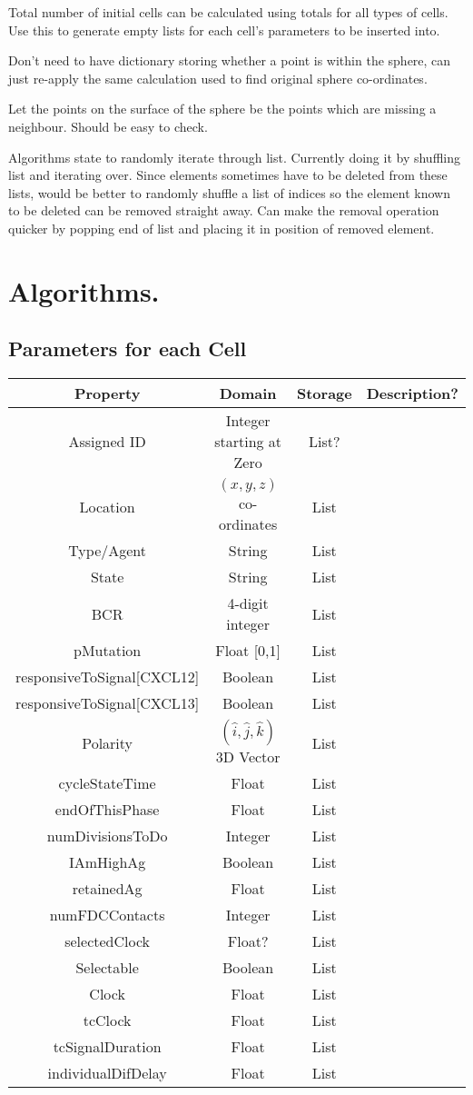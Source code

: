 \documentclass[english]{article}
\begin{document}
Total number of initial cells can be calculated using totals for all types of cells. Use this to generate empty lists for each cell's parameters to be inserted into. 

Don't need to have dictionary storing whether a point is within the sphere, can just re-apply the same calculation used to find original sphere co-ordinates. 

Let the points on the surface of the sphere be the points which are missing a neighbour. Should be easy to check.

Algorithms state to randomly iterate through list. Currently doing it by shuffling list and iterating over. Since elements sometimes have to be deleted from these lists, would be better to randomly shuffle a list of indices so the element known to be deleted can be removed straight away. Can make the removal operation quicker by popping end of list and placing it in position of removed element. 




\section{Algorithms.}

\subsection{Parameters for each Cell}
\begin{center}

\begin{tabular}{|c|c|c|c|}
\hline 
Property & Domain & Storage & Description?\tabularnewline
\hline 
\hline 
Assigned ID & Integer starting at Zero & List? & \tabularnewline
\hline 
Location & $(x,y,z)$ co-ordinates & List & \tabularnewline
\hline
Type/Agent & String & List & \tabularnewline
\hline 
State & String & List & \tabularnewline
\hline 
BCR & 4-digit integer & List & \tabularnewline
\hline 
pMutation & Float [0,1] & List & \tabularnewline
\hline 
responsiveToSignal{[}CXCL12{]} & Boolean & List & \tabularnewline
\hline 
responsiveToSignal{[}CXCL13{]} & Boolean & List & \tabularnewline
\hline 
Polarity & $(\hat{i},\hat{j},\hat{k})$ 3D Vector  & List & \tabularnewline
\hline 
cycleStateTime & Float & List & \tabularnewline
\hline 
endOfThisPhase & Float & List & \tabularnewline
\hline 
numDivisionsToDo & Integer & List & \tabularnewline
\hline 
IAmHighAg & Boolean & List & \tabularnewline
\hline 
retainedAg & Float & List & \tabularnewline
\hline 
numFDCContacts & Integer & List & \tabularnewline
\hline 
selectedClock & Float? & List & \tabularnewline
\hline 
Selectable & Boolean & List & \tabularnewline
\hline 
Clock & Float & List & \tabularnewline
\hline 
tcClock & Float & List & \tabularnewline
\hline 
tcSignalDuration & Float & List & \tabularnewline
\hline 
individualDifDelay & Float & List & \tabularnewline
\hline 
\end{tabular}

\end{center}
\end{document}
